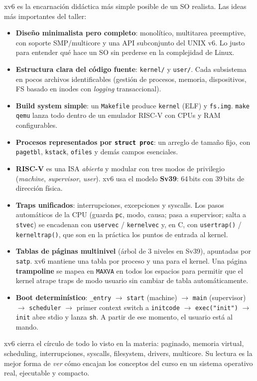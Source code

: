 \documentclass[11pt,a4paper]{article}
\begin{document}
xv6 es la encarnación didáctica más simple posible de un SO realista.
Las ideas más importantes del taller:

\begin{itemize}[leftmargin=*]
    \item \textbf{Diseño minimalista pero completo}: monolítico,
        multitarea preemptive, con soporte SMP/multicore y una API
        subconjunto del UNIX v6. Lo justo para entender qué hace un
        SO sin perderse en la complejidad de Linux.
    \item \textbf{Estructura clara del código fuente}: \texttt{kernel/}
        y \texttt{user/}. Cada subsistema en pocos archivos
        identificables (gestión de procesos, memoria, dispositivos,
        FS basado en inodes con \emph{logging} transaccional).
    \item \textbf{Build system simple}: un \texttt{Makefile} produce
        \texttt{kernel} (ELF) y \texttt{fs.img}. \texttt{make qemu}
        lanza todo dentro de un emulador RISC-V con CPUs y RAM
        configurables.
    \item \textbf{Procesos representados por \texttt{struct proc}}:
        un arreglo de tamaño fijo, con \texttt{pagetbl},
        \texttt{kstack}, \texttt{ofiles} y demás campos esenciales.
    \item \textbf{RISC-V} es una ISA \emph{abierta} y modular con
        tres modos de privilegio (\emph{machine}, \emph{supervisor},
        \emph{user}). xv6 usa el modelo \textbf{Sv39}: 64\,bits con
        39\,bits de dirección física.
    \item \textbf{Traps unificados}: interrupciones, excepciones y
        syscalls. Los pasos automáticos de la CPU (guarda
        \texttt{pc}, modo, causa; pasa a supervisor; salta a
        \texttt{stvec}) se encadenan con \texttt{uservec} /
        \texttt{kernelvec} y, en C, con \texttt{usertrap()} /
        \texttt{kerneltrap()}, que son en la práctica los puntos de
        entrada al kernel.
    \item \textbf{Tablas de páginas multinivel} (árbol de 3 niveles
        en Sv39), apuntadas por \texttt{satp}. xv6 mantiene una
        tabla por proceso y una para el kernel. Una página
        \textbf{trampoline} se mapea en \texttt{MAXVA} en todos los
        espacios para permitir que el kernel atrape traps de modo
        usuario sin cambiar de tabla automáticamente.
    \item \textbf{Boot determinístico}: \texttt{\_entry} $\to$
        \texttt{start} (machine) $\to$ \texttt{main} (supervisor)
        $\to$ \texttt{scheduler} $\to$ primer context switch a
        \texttt{initcode} $\to$ \texttt{exec("init")} $\to$
        \texttt{init} abre stdio y lanza \texttt{sh}. A partir de
        ese momento, el usuario está al mando.
\end{itemize}

\begin{idea}
xv6 cierra el círculo de todo lo visto en la materia: paginado,
memoria virtual, scheduling, interrupciones, syscalls, filesystem,
drivers, multicore. Su lectura es la mejor forma de \emph{ver} cómo
encajan los conceptos del curso en un sistema operativo real,
ejecutable y compacto.
\end{idea}
\end{document}
